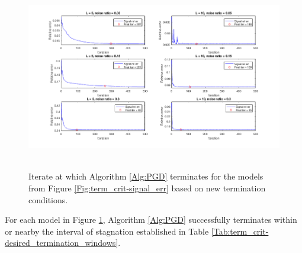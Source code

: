 \begin{enumerate}
\begin{figure}[H]
\centering
\hbox{\hspace{-1.9cm} \includegraphics[scale=0.6]{term_crit-model_term_for_tols} }\vspace{-0.4cm}
	\caption{Iterate at which Algorithm \ref{Alg:PGD} terminates for the models from Figure \ref{Fig:term_crit-signal_err} based on new termination conditions.}
\label{Fig:term_crit-model_term_for_tols}
\end{figure}

For each model in Figure \ref{Fig:term_crit-model_term_for_tols}, Algorithm \ref{Alg:PGD} successfully terminates within or nearby the interval of stagnation established in Table \ref{Tab:term_crit-desired_termination_windows}.




\end{enumerate}


